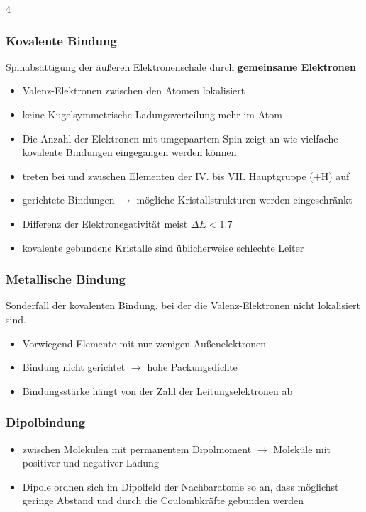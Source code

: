\documentclass[fs, footer]{latex4ei_custom}
\begin{document}
\begin{multicols*}{4}
{		\subsubsection{Kovalente Bindung}
		Spinabsättigung der äußeren Elektronenschale durch \textbf{gemeinsame Elektronen}

		\begin{itemize}
			\item Valenz-Elektronen zwischen den Atomen lokalisiert
			\item keine Kugelsymmetrische Ladungsverteilung mehr im Atom
			\item Die Anzahl der Elektronen mit umgepaartem Spin zeigt an wie vielfache kovalente Bindungen eingegangen werden können
			\item treten bei und zwischen Elementen der IV. bis VII. Hauptgruppe (+H) auf
			\item gerichtete Bindungen $\rightarrow$ mögliche Kristallstrukturen werden eingeschränkt
			\item Differenz der Elektronegativität meist $\Delta E<1.7$
			\item kovalente gebundene Kristalle sind üblicherweise schlechte Leiter
		\end{itemize}


		\subsubsection{Metallische Bindung}
		Sonderfall der kovalenten Bindung, bei der die Valenz-Elektronen nicht lokalisiert sind.
		\begin{itemize}
			\item Vorwiegend Elemente mit nur wenigen Außenelektronen
			\item Bindung nicht gerichtet $\rightarrow$ hohe Packungsdichte
			\item Bindungsstärke hängt von der Zahl der Leitungselektronen ab
		\end{itemize}

		\subsubsection{Dipolbindung}
		\begin{itemize}
			\item zwischen Molekülen mit permanentem Dipolmoment $\rightarrow$ Moleküle mit positiver und negativer Ladung
			\item Dipole ordnen sich im Dipolfeld der Nachbaratome so an, dass möglichst geringe Abstand und durch die Coulombkräfte gebunden werden
		\end{itemize}

}
\end{multicols*}
\end{document}
